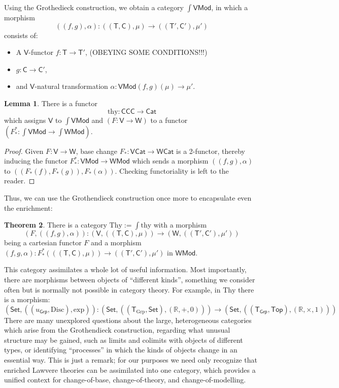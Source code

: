 \documentclass{amsart}
\theoremstyle{definition}
\newtheorem{theorem}{Theorem}
\newtheorem{lemma}[theorem]{Lemma}
\newcommand{\Set}{\mathsf{Set}}
\newcommand{\Grp}{\mathsf{Grp}}
\newcommand{\Cat}{\mathsf{Cat}}
\newcommand{\Top}{\mathsf{Top}}
\newcommand{\CCC}{\mathsf{CCC}}
\newcommand{\Mod}{\mathsf{Mod}}
\newcommand{\V}{\mathsf{V}}
\newcommand{\W}{\mathsf{W}}
\newcommand{\C}{\mathsf{C}}
\newcommand{\T}{\mathsf{T}}
\newcommand{\maps}{\colon}
\begin{document}
Using the Grothedieck construction, we obtain a category \textbf{$\int \V\Mod$}, in which a morphism 
\[   ((f,g),\alpha)\maps ((\T,\C),\mu) \to ((\T',\C'),\mu') \]
consists of:
\begin{itemize}
\item
A $\V$-functor $f\maps\T\to \T'$, (OBEYING SOME CONDITIONS!!!)
\item
$g\maps\C\to \C'$, 
\item and $\V$-natural transformation $\alpha\maps\V\Mod(f,g)(\mu)\to \mu'$.
\end{itemize}

\begin{lemma}
	There is a functor $$\mathrm{thy}\maps \CCC \to \Cat$$ which assigns $\V$ to $\int \V\Mod$ and $(F\maps \V \to \W)$ to a functor $(F_*^*\maps \int \V\Mod \to \int \W\Mod)$.
\end{lemma}
\begin{proof}
	Given $F\maps\V\to \W$, base change $F_*\maps \V\Cat \to \W\Cat$ is a 2-functor, thereby inducing the functor $F_*^*\maps\V\Mod\to \W\Mod$ which sends a morphism $((f,g),\alpha)$ to $((F_*(f),F_*(g)),F_*(\alpha))$. Checking functoriality is left to the reader.
\end{proof}

Thus, we can use the Grothendieck construction once more to encapsulate even the enrichment:
\begin{theorem}
	There is a category $\mathrm{Thy} := \int \mathrm{thy}$ with a morphism $$(F,((f,g),\alpha))\maps (\V,((\T,\C),\mu)) \to (\W,((\T',\C'),\mu'))$$ being a cartesian functor $F$ and a morphism $(f,g,\alpha)\maps F_*^*(((\T,\C),\mu)) \to ((\T',\C'),\mu')$ in $\W\Mod$.
\end{theorem}

This category assimilates a whole lot of useful information. Most importantly, there are morphisms between objects of ``different kinds'', something we consider often but is normally not possible in category theory. For example, in $\mathrm{Thy}$ there is a morphism: 
\[ (\Set, ((u_{\Grp}, \mathrm{Disc}), \mathrm{exp}))\maps (\Set,((\T_{\mathrm{Grp}},\Set),(\mathbb{R},+,0))) \to (\Set,((\T_\Grp,\Top),(\mathbb{R},\times,1))) \]
There are many unexplored questions about the large, heterogeneous categories which arise from the Grothendieck construction, regarding what unusual structure may be gained, such as limits and colimits with objects of different types, or identifying ``processes'' in which the kinds of objects change in an essential way. This is just a remark; for our purposes we need only recognize that enriched Lawvere theories can be assimilated into one category, which provides a unified context for change-of-base, change-of-theory, and change-of-modelling.
\end{document}
